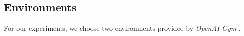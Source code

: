 \subsection{Environments}
For our experiments, we choose two environments provided by \textit{OpenAI Gym} \cite{gym}.